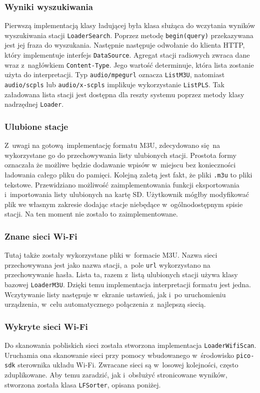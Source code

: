 \documentclass[polish]{aghengthesis}
\begin{document}
			\subsubsection{Wyniki wyszukiwania}
				Pierwszą implementacją klasy ładującej była klasa służąca do wczytania wyników wyszukiwania stacji \lstinline|LoaderSearch|. Poprzez metodę \lstinline|begin(query)| przekazywana jest jej fraza do wyszukania. Następnie następuje odwołanie do klienta HTTP, który implementuje interfejs \lstinline|DataSource|. Agregat stacji radiowych zwraca dane wraz z~nagłówkiem \lstinline|Content-Type|. Jego wartość determinuje, która lista zostanie użyta do interpretacji. Typ \lstinline|audio/mpegurl| oznacza \lstinline|ListM3U|, natomiast \lstinline|audio/scpls| lub \lstinline|audio/x-scpls| implikuje wykorzystanie \lstinline|ListPLS|. Tak załadowana lista stacji jest dostępna dla reszty systemu poprzez metody klasy nadrzędnej \lstinline|Loader|.
			
			\subsubsection{Ulubione stacje}
				Z~uwagi na gotową implementację formatu M3U, zdecydowano się na wykorzystane go do przechowywania listy ulubionych stacji. Prostota formy oznaczała że możliwe będzie dodawanie wpisów w~miejscu bez konieczności ładowania całego pliku do pamięci. Kolejną zaletą jest fakt, że pliki \lstinline|.m3u| to pliki tekstowe. Przewidziano możliwość zaimplementowania funkcji eksportowania i~importowania listy ulubionych na kartę SD. Użytkownik mógłby modyfikować plik we własnym zakresie dodając stacje niebędące w~ogólnodostępnym spisie stacji. Na ten moment nie zostało to zaimplementowane.

			\subsubsection{Znane sieci Wi-Fi}
				Tutaj także zostały wykorzystane pliki w~formacie M3U. Nazwa sieci przechowywana jest jako nazwa stacji, a~pole \lstinline|url| wykorzystano na przechowywanie hasła. Lista ta, razem z~listą ulubionych stacji używa klasy bazowej \lstinline|LoaderM3U|. Dzięki temu implementacja interpretacji formatu jest jedna. Wczytywanie listy następuje w~ekranie ustawień, jak i~po uruchomieniu urządzenia, w~celu automatycznego połączenia z~najlepszą siecią.
				
			\subsubsection{Wykryte sieci Wi-Fi}
				Do skanowania pobliskich sieci została stworzona implementacja \lstinline|LoaderWifiScan|. Uruchamia ona skanowanie sieci przy pomocy wbudowanego w~środowisko \lstinline|pico-sdk| sterownika układu Wi-Fi. Zwracane sieci są w~losowej kolejności, często zduplikowane. Aby temu zaradzić, jak i~obsłużyć stronicowane wyników, stworzona została klasa \lstinline|LFSorter|, opisana poniżej.
				
\end{document}
